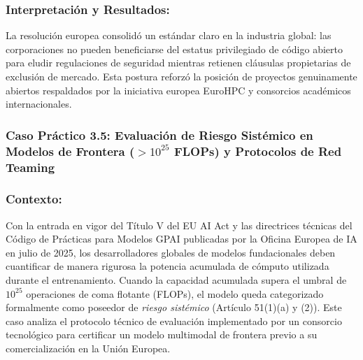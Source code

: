 \subsubsection*{Interpretación y Resultados:}
La resolución europea consolidó un estándar claro en la industria global: las corporaciones no pueden beneficiarse del estatus privilegiado de código abierto para eludir regulaciones de seguridad mientras retienen cláusulas propietarias de exclusión de mercado. Esta postura reforzó la posición de proyectos genuinamente abiertos respaldados por la iniciativa europea EuroHPC y consorcios académicos internacionales.

\subsubsection{Caso Práctico 3.5: Evaluación de Riesgo Sistémico en Modelos de Frontera ($>10^{25}$ FLOPs) y Protocolos de Red Teaming}

\subsubsection*{Contexto:}
Con la entrada en vigor del Título V del EU AI Act y las directrices técnicas del Código de Prácticas para Modelos GPAI publicadas por la Oficina Europea de IA en julio de 2025, los desarrolladores globales de modelos fundacionales deben cuantificar de manera rigurosa la potencia acumulada de cómputo utilizada durante el entrenamiento. Cuando la capacidad acumulada supera el umbral de $10^{25}$ operaciones de coma flotante (FLOPs), el modelo queda categorizado formalmente como poseedor de \textit{riesgo sistémico} (Artículo 51(1)(a) y (2)). Este caso analiza el protocolo técnico de evaluación implementado por un consorcio tecnológico para certificar un modelo multimodal de frontera previo a su comercialización en la Unión Europea.

